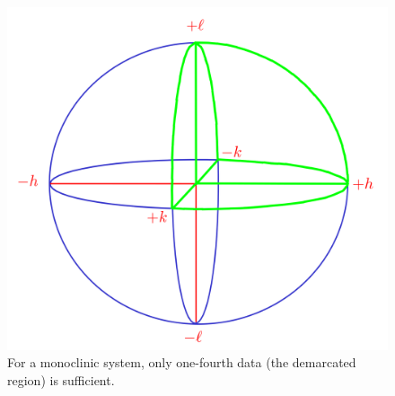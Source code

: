 \begin{figure}
	\centering
	\includegraphics[scale=0.12]{one_fourth_sphere1.png}
	\caption{\label{fig:one_fourth_sphere}For a monoclinic system, only one-fourth data (the demarcated region) is sufficient.}
\end{figure}

